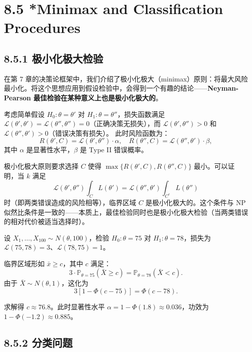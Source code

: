 \section{8.5 *Minimax and Classification Procedures}\label{sec:8.5}

\subsection{8.5.1 极小化极大检验}

在第 7 章的决策论框架中，我们介绍了极小化极大（minimax）原则：将最大风险最小化。将这个思想应用到假设检验中，会得到一个有趣的结论——\textbf{Neyman-Pearson 最佳检验在某种意义上也是极小化极大的}。

考虑简单假设 $H_0: \theta = \theta'$ 对 $H_1: \theta = \theta''$，损失函数满足 $\mathcal{L}(\theta', \theta') = \mathcal{L}(\theta'', \theta'') = 0$（正确决策无损失），而 $\mathcal{L}(\theta', \theta'') > 0$ 和 $\mathcal{L}(\theta'', \theta') > 0$（错误决策有损失）。
此时风险函数为：
\[
R(\theta', C) = \mathcal{L}(\theta', \theta'') \cdot \alpha, \quad R(\theta'', C) = \mathcal{L}(\theta'', \theta') \cdot \beta,
\]
其中 $\alpha$ 是显著性水平，$\beta$ 是 Type II 错误概率。

极小化极大原则要求选择 $C$ 使得 $\max\{R(\theta', C), R(\theta'', C)\}$ 最小。可以证明，当 $k$ 满足
\[
\mathcal{L}(\theta', \theta'') \int_C L(\theta') = \mathcal{L}(\theta'', \theta') \int_{C^c} L(\theta'')
\]
时（即两类错误造成的风险相等），临界区域 $C$ 是极小化极大的。这个条件与 NP 似然比条件是一致的——本质上，最佳检验同时也是极小化极大检验（当两类错误的相对代价被适当选择时）。
\begin{example}[正态均值的极小化极大检验]\label{ex:minimax-normal}
设 $X_1, \ldots, X_{100} \sim N(\theta, 100)$，检验 $H_0: \theta = 75$ 对 $H_1: \theta = 78$，损失为 $\mathcal{L}(75, 78) = 3$、$\mathcal{L}(78, 75) = 1$。

临界区域形如 $\bar{x} \geq c$，其中 $c$ 满足：
\[
3 \cdot \mathbb{P}_{\theta=75}(\bar{X} \geq c) = \mathbb{P}_{\theta=78}(\bar{X} < c).
\]
由于 $\bar{X} \sim N(\theta, 1)$，这化为
\[
3[1 - \Phi(c-75)] = \Phi(c-78).
\]

求解得 $c \approx 76.8$。此时显著性水平 $\alpha = 1 - \Phi(1.8) \approx 0.036$，功效为 $1 - \Phi(-1.2) \approx 0.885$。\end{example}

\subsection{8.5.2 分类问题}

